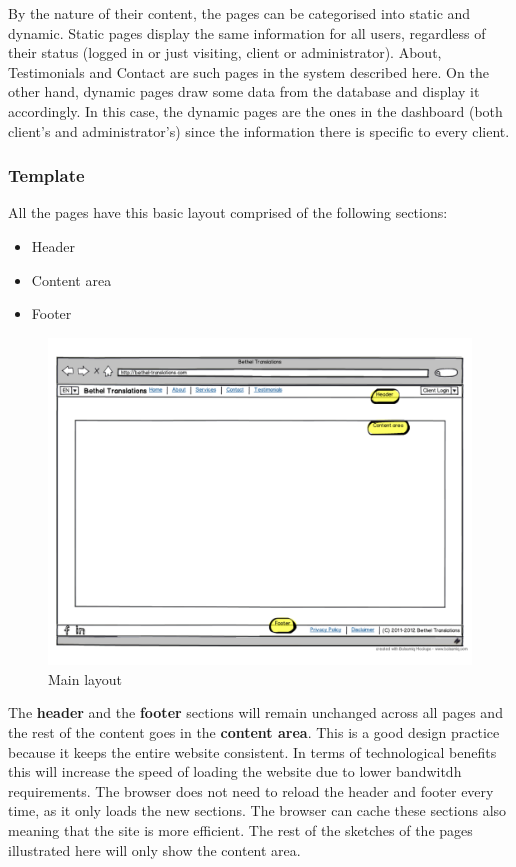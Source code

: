 \documentclass{l3proj}
\begin{document}
By the nature of their content, the pages can be categorised into static and
dynamic. Static pages display the same information for all users, regardless of
their status (logged in or just visiting, client or administrator). About,
Testimonials and Contact are such pages in the system described here. On the
other hand, dynamic pages draw some data from the database and display it
accordingly. In this case, the dynamic pages are the ones in the dashboard
(both client’s and administrator’s) since the information there is specific to
every client.



\subsubsection*{Template}
All the pages have this basic layout comprised of the following sections:
\begin{itemize} \itemsep1pt \parskip0pt 
	\item Header
	\item Content area
	\item Footer
\end{itemize}

\begin{figure}
\centering
\includegraphics[width=\linewidth, trim = 0px 50px 0px 50px]
	{wireframes/main-layout}
\caption{Main layout}
\label{wireframes-main-layout}
\end{figure}

The \textbf{header} and the \textbf{footer} sections will remain unchanged
across all pages and the rest of the content goes in the \textbf{content area}.
This is a good design practice because it keeps the entire website consistent. In 
terms of technological benefits this will increase the speed of loading the website 
due to lower bandwitdh requirements. The browser does not need to reload the header 
and footer every time, as it only loads the new sections. The browser can cache
these sections also meaning that the site is more efficient.
The rest of the sketches of the pages illustrated here will only show the
content area.
\end{document}
